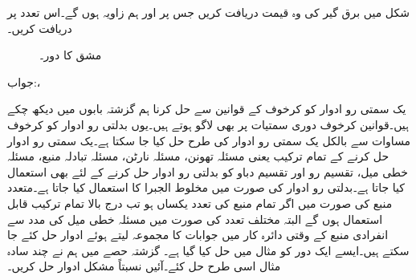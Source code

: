 شکل  میں برق گیر کی وہ قیمت دریافت کریں جس پر  اور  ہم زاویہ ہوں گے۔اس تعدد پر  دریافت کریں۔
\begin{figure}
\centering
{}
\caption{مشق  کا دور۔}
\label{شکل_بدلتا_دو_پرزے_متوازی_ب}
\end{figure}

جواب:، 

یک سمتی رو ادوار کو کرخوف کے قوانین سے حل کرنا ہم گزشتہ بابوں میں دیکھ چکے ہیں۔قوانین کرخوف دوری سمتیات پر بھی لاگو ہوتے ہیں۔یوں بدلتی رو ادوار کو کرخوف مساوات سے بالکل یک سمتی رو ادوار کی طرح حل کیا جا سکتا ہے۔یک سمتی رو ادوار حل کرنے کے تمام ترکیب یعنی مسئلہ تھونن، مسئلہ نارٹن، مسئلہ تبادلہ منبع، مسئلہ خطی میل، تقسیم رو اور تقسیم دباو کو بدلتی رو ادوار حل کرنے کے لئے بھی استعمال کیا جاتا ہے۔بدلتی رو ادوار کی صورت میں مخلوط الجبرا کا استعمال کیا جاتا ہے۔متعدد منبع کی صورت میں اگر تمام منبع کی تعدد یکساں ہو تب درج بالا تمام ترکیب قابل استعمال ہوں گے البتہ مختلف تعدد کی صورت میں مسئلہ خطی میل کی مدد سے انفرادی منبع کے وقتی دائرہ کار میں جوابات کا مجموعہ لیتے ہوئے ادوار حل کئے جا سکتے ہیں۔ایسے ایک دور کو مثال  میں حل کیا گیا ہے۔ گزشتہ حصے میں ہم نے چند سادہ مثال اسی طرح حل کئے۔آئیں نسبتاً مشکل ادوار حل کریں۔


